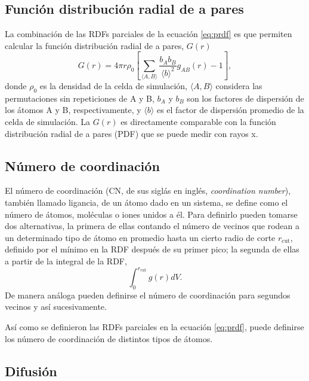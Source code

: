 \subsection{Función distribución radial de a pares}

La combinación de las RDFs parciales de la ecuación \ref{eq:prdf} es que permiten
calcular la función distribución radial de a pares, $G(r)$ \cite{billinge2019}
\begin{equation}
    G(r) = 4 \pi r \rho_0 \left[\sum_{\langle A,B \rangle} \frac{b_A b_B}{\langle b\rangle^2} g_{AB}(r) - 1\right], 
\end{equation}
donde $\rho_0$ es la densidad de la celda de simulación, $\langle A, B \rangle$
considera las permutaciones sin repeticiones de A y B, $b_A$ y $b_B$ son los 
factores de dispersión de los átomos A y B, respectivamente, y $\langle b \rangle$
es el factor de dispersión promedio de la celda de simulación. La $G(r)$ es 
directamente comparable con la función distribución radial de a pares (PDF) que 
se puede medir con rayos x.


\subsection{Número de coordinación}

El número de coordinación (CN, de sus siglás en inglés, \textit{coordination 
number}), también llamado ligancia, de un átomo dado en un sistema, se define 
como el número de átomos, moléculas o iones unidos a él. Para definirlo pueden 
tomarse dos alternativas, la primera de ellas contando el número de vecinos que 
rodean a un determinado tipo de átomo en promedio hasta un cierto radio de corte 
$r_{\text{cut}}$, definido por el mínimo en la RDF después de su primer pico; 
la segunda de ellas a partir de la integral de la RDF,
\begin{equation}
    \int_0^{r_{\text{cut}}} g(r) dV.
\end{equation}
De manera análoga pueden definirse el número de coordinación para segundos 
vecinos y así sucesivamente.

Así como se definieron las RDFs parciales en la ecuación \ref{eq:prdf}, puede 
definirse los número de coordinación de distintos tipos de átomos.


\subsection{Difusión}

